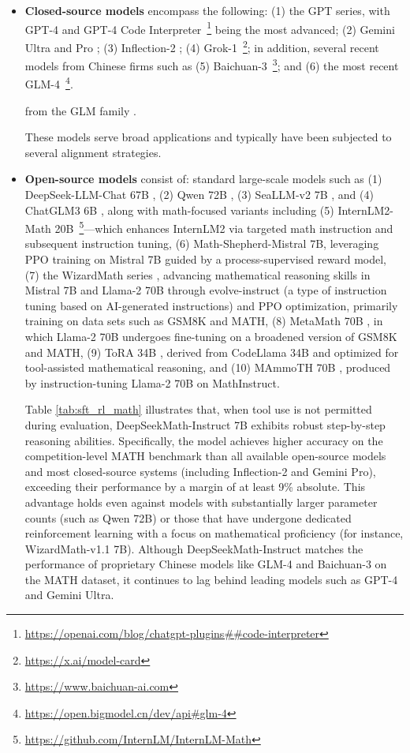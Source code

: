 \begin{itemize}[topsep=0pt]
\begin{itemize}[topsep=0pt]
    \item \textbf{Closed-source models} encompass the following: (1) the GPT series, with GPT-4 \citep{gpt4} and GPT-4 Code Interpreter~\footnote{\url{https://openai.com/blog/chatgpt-plugins\#\#code-interpreter}} being the most advanced; (2) Gemini Ultra and Pro \citep{gemini}; (3) Inflection-2 \citep{inflection-2}; (4) Grok-1~\footnote{\url{https://x.ai/model-card}}; in addition, several recent models from Chinese firms such as (5) Baichuan-3~\footnote{\url{https://www.baichuan-ai.com}}; and (6) the most recent GLM-4~\footnote{\url{https://open.bigmodel.cn/dev/api\#glm-4}}.

    from the GLM family \citep{glm}.

These models serve broad applications and typically have been subjected to several alignment strategies.
\item \textbf{Open-source models} consist of: standard large-scale models such as (1) DeepSeek-LLM-Chat 67B \citep{deepseek-llm}, (2) Qwen 72B \citep{qwen}, (3) SeaLLM-v2 7B \citep{seallm}, and (4) ChatGLM3 6B \citep{chatglm3}, along with math-focused variants including (5) InternLM2-Math 20B~\footnote{\url{https://github.com/InternLM/InternLM-Math}}—which enhances InternLM2 via targeted math instruction and subsequent instruction tuning, (6) Math-Shepherd-Mistral 7B, leveraging PPO training \citep{schulman2017proximal} on Mistral 7B \citep{mistral} guided by a process-supervised reward model, (7) the WizardMath series \citep{wizardmath}, advancing mathematical reasoning skills in Mistral 7B and Llama-2 70B \citep{llama2} through evolve-instruct (a type of instruction tuning based on AI-generated instructions) and PPO optimization, primarily training on data sets such as GSM8K and MATH, (8) MetaMath 70B \citep{metamath}, in which Llama-2 70B undergoes fine-tuning on a broadened version of GSM8K and MATH, (9) ToRA 34B \cite{tora}, derived from CodeLlama 34B and optimized for tool-assisted mathematical reasoning, and (10) MAmmoTH 70B \citep{MathInstruct}, produced by instruction-tuning Llama-2 70B on MathInstruct.

Table \ref{tab:sft_rl_math} illustrates that, when tool use is not permitted during evaluation, DeepSeekMath-Instruct 7B exhibits robust step-by-step reasoning abilities. Specifically, the model achieves higher accuracy on the competition-level MATH benchmark than all available open-source models and most closed-source systems (including Inflection-2 and Gemini Pro), exceeding their performance by a margin of at least 9\% absolute. This advantage holds even against models with substantially larger parameter counts (such as Qwen 72B) or those that have undergone dedicated reinforcement learning with a focus on mathematical proficiency (for instance, WizardMath-v1.1 7B). Although DeepSeekMath-Instruct matches the performance of proprietary Chinese models like GLM-4 and Baichuan-3 on the MATH dataset, it continues to lag behind leading models such as GPT-4 and Gemini Ultra.


\end{itemize}
\end{itemize}
